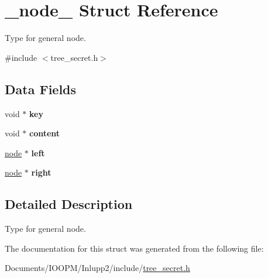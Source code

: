 \hypertarget{struct__node__}{}\section{\+\_\+node\+\_\+ Struct Reference}
\label{struct__node__}


Type for general node.  




{\ttfamily \#include $<$tree\+\_\+secret.\+h$>$}

\subsection*{Data Fields}
\begin{DoxyCompactItemize}
\item 
\hypertarget{struct__node___ab5c000aec752f2206131e183daf5efbf}{}void $\ast$ {\bfseries key}\label{struct__node___ab5c000aec752f2206131e183daf5efbf}

\item 
\hypertarget{struct__node___a3d6d14728fec84498eff595a3e31d15a}{}void $\ast$ {\bfseries content}\label{struct__node___a3d6d14728fec84498eff595a3e31d15a}

\item 
\hypertarget{struct__node___a1ef696d612a6d91ca233f86051a17560}{}\hyperlink{struct__node__}{node} $\ast$ {\bfseries left}\label{struct__node___a1ef696d612a6d91ca233f86051a17560}

\item 
\hypertarget{struct__node___a894eba354b6e329d3a4e5ef5bd51d494}{}\hyperlink{struct__node__}{node} $\ast$ {\bfseries right}\label{struct__node___a894eba354b6e329d3a4e5ef5bd51d494}

\end{DoxyCompactItemize}


\subsection{Detailed Description}
Type for general node. 

The documentation for this struct was generated from the following file\+:\begin{DoxyCompactItemize}
\item 
Documents/\+I\+O\+O\+P\+M/\+Inlupp2/include/\hyperlink{tree__secret_8h}{tree\+\_\+secret.\+h}\end{DoxyCompactItemize}
